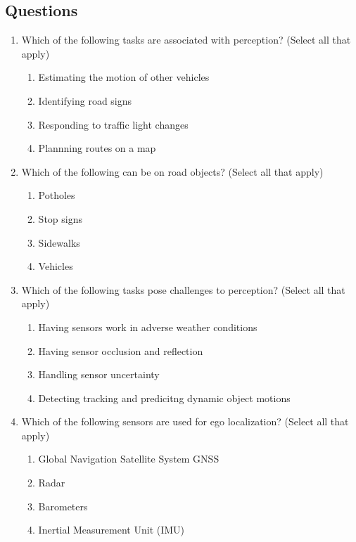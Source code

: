 \subsection{Questions}
\label{perception_questions}

\begin{enumerate}

\item Which of the following tasks are associated with perception? (Select all that apply) 
\begin{enumerate}
\item Estimating the motion of other vehicles
\item Identifying road signs
\item Responding to traffic light changes
\item Plannning routes on a map
\end{enumerate}

\item Which of the following can be on road objects? (Select all that apply) 

\begin{enumerate}
\item Potholes
\item Stop signs
\item Sidewalks
\item Vehicles
\end{enumerate}

\item Which of the following tasks pose challenges to perception? (Select all that apply) 

\begin{enumerate}
\item Having sensors work in adverse weather conditions
\item Having sensor occlusion and reflection
\item Handling sensor uncertainty
\item Detecting tracking and predicitng dynamic object motions
\end{enumerate}

\item Which of the following sensors are used for ego localization? (Select all that apply) 


\begin{enumerate}
\item Global Navigation Satellite System GNSS
\item Radar
\item Barometers
\item Inertial Measurement Unit (IMU)
\end{enumerate}


\end{enumerate}
